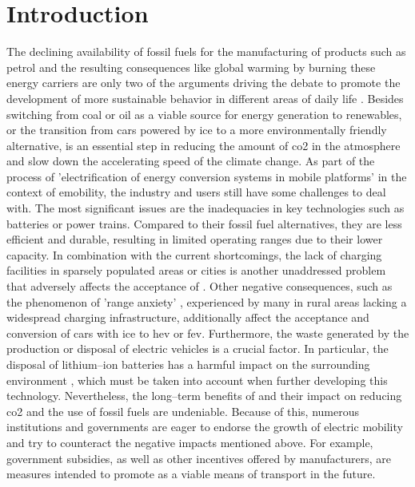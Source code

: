 
\chapter{Introduction}
\label{ch:Introduction}

The declining availability of fossil fuels for the manufacturing of products such as petrol and the resulting consequences like global warming by burning these energy carriers are only two of the arguments driving the debate to promote the development of more sustainable behavior in different areas of daily life \cite{kathiresh_e-mobility_2022}.
Besides switching from coal or oil as a viable source for energy generation to renewables, or the transition from cars powered by \acrfull{ice} to a more environmentally friendly alternative, is an essential step in reducing the amount of \acrfull{co2} in the atmosphere and slow down the accelerating speed of the climate change.
As part of the process of 'electrification of energy conversion systems in mobile platforms' \cite[165226]{adib_e-mobility_2019} in the context of \acrfull{emobility}, the industry and users still have some challenges to deal with.
The most significant issues are the inadequacies in key technologies such as batteries or power trains. Compared to their fossil fuel alternatives, they are less efficient and durable, resulting in limited operating ranges due to their lower capacity. 
In combination with the current shortcomings, the lack of charging facilities in sparsely populated areas or cities is another unaddressed problem that adversely affects the acceptance of .
Other negative consequences, such as the phenomenon of 'range anxiety' \cite{rauh_understanding_2015}, experienced by many  in rural areas lacking a widespread charging infrastructure, additionally affect the acceptance and conversion of cars with \acrshort{ice} to \acrfull{hev} or \acrfull{fev}. 
Furthermore, the waste generated by the production or disposal of electric vehicles is a crucial factor. In particular, the disposal of lithium--ion batteries has a harmful impact on the surrounding environment \cite{xu_generation_2017}, which must be taken into account when further developing this technology.
Nevertheless, the long--term benefits of  and their impact on reducing \acrshort{co2} and the use of fossil fuels are undeniable.
Because of this, numerous institutions and governments are eager to endorse the growth of electric mobility and try to counteract the negative impacts mentioned above.
For example, government subsidies, as well as other incentives offered by manufacturers, are measures intended to promote  as a viable means of transport in the future.

